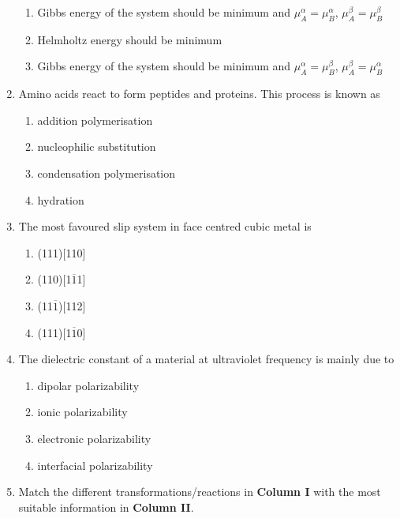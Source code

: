 \documentclass[journal]{IEEEtran}
\numberwithin{equation}{enumi}
\numberwithin{figure}{enumi}
\begin{document}
\begin{enumerate}
\begin{enumerate}
			\item Gibbs energy of the system should be minimum and $\mu_A^{\alpha} = \mu_B^{\alpha}$, $\mu_A^{\beta} = \mu_B^{\beta}$
			\item Helmholtz energy should be minimum
			\item Gibbs energy of the system should be minimum and $\mu_A^{\alpha} = \mu_B^{\beta}$, $\mu_A^{\beta} = \mu_B^{\alpha}$
		\end{enumerate}
	\item Amino acids react to form peptides and proteins. This process is known as
		\begin{enumerate}
			\item addition polymerisation
			\item nucleophilic substitution
			\item condensation polymerisation
			\item hydration
		\end{enumerate}
	\item The most favoured slip system in face centred cubic metal is
		\begin{enumerate}                                                                   
			\item (111)[110]                                               
			\item (110)[1$\overline{1}$1]
			\item (11$\overline{1}$)[112]
			\item (111)[1$\overline{1}$0]
                \end{enumerate}
	\item The dielectric constant of a material at ultraviolet frequency is mainly due to
		\begin{enumerate}                                                                   
                        \item dipolar polarizability                                         
                        \item ionic polarizability
                        \item electronic polarizability
                        \item interfacial polarizability
                \end{enumerate}
	\item Match the different transformations/reactions in \textbf{Column I} with the most suitable information in \textbf{Column II}.
		\begin{multicols}{2}

\end{multicols}
\end{enumerate}
\end{document}
